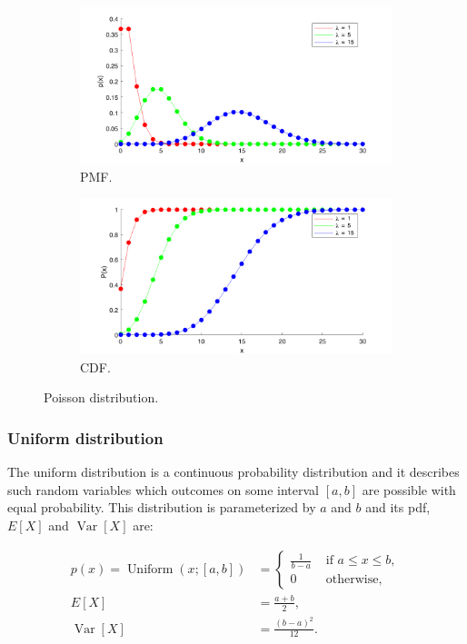 \begin{figure}
\centering
\begin{subfigure}{.5\textwidth}
  \centering
  \includegraphics[width=.9\linewidth]{figures/poisson.pmf.png}
  \caption{PMF.}
  \label{fig:poisson:pmf}
\end{subfigure}%
\begin{subfigure}{.5\textwidth}
  \centering
  \includegraphics[width=.9\linewidth]{figures/poisson.cdf.png}
  \caption{CDF.}
  \label{fig:poisson:cdf}
\end{subfigure}
\caption{Poisson distribution.}
\label{fig:poisson}
\end{figure}

\subsubsection{Uniform distribution}

The uniform distribution is a continuous probability distribution and it
describes such random variables which outcomes on some interval $[a, b]$
are possible with equal probability. This distribution is parameterized by
$a$ and $b$ and its pdf, $E[X]$ and $\operatorname{Var}[X]$ are:

$$
\begin{aligned}
    p(x)
        =\operatorname{Uniform}(x; [a, b])
        &= \begin{cases}
            \frac{1}{b-a} & \text { if } a \leq x \leq b, \\
            0 & \text { otherwise, }
        \end{cases} \\
    E[X] &= \frac{a + b}{2}, \\
    \operatorname{Var}[X] &= \frac{(b - a)^2}{12}.
\end{aligned}
$$


